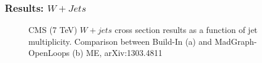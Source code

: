 \documentclass{beamer}
\numberwithin{figure}{section}
\begin{document}
\begin{frame}
 \frametitle{Results: $W+Jets$} 

\begin{figure}[!tbp]
  \centering
  \hfill
  \caption{\scriptsize{CMS (7 TeV) $W+jets$ cross section results as a function of jet multiplicity. Comparison between Build-In (a) and MadGraph-OpenLoops (b) ME, arXiv:1303.4811}}
\end{figure}
 

\end{frame}

\end{document}
